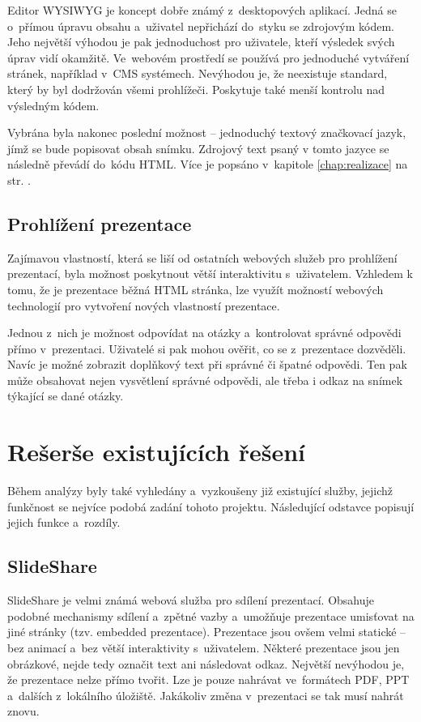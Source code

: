 \documentclass[11pt,twoside,a4paper]{book}
\begin{document}
Editor WYSIWYG je koncept dobře známý z~desktopových aplikací. Jedná se o~přímou úpravu obsahu a~uživatel nepřichází do~styku se zdrojovým kódem. Jeho největší výhodou je pak jednoduchost pro uživatele, kteří výsledek svých úprav vidí okamžitě. Ve~webovém prostředí se používá pro jednoduché vytváření stránek, například v~CMS systémech. Nevýhodou je, že neexistuje standard, který by byl dodržován všemi prohlížeči. Poskytuje také menší kontrolu nad výsledným kódem. 

Vybrána byla nakonec poslední možnost – jednoduchý textový značkovací jazyk, jímž se bude popisovat obsah snímku. Zdrojový text psaný v tomto jazyce se následně převádí do~kódu HTML. Více je popsáno v~kapitole \ref{chap:realizace}  na str. \pageref{chap:realizace}.

\subsection{Prohlížení prezentace}
Zajímavou vlastností, která se liší od ostatních webových služeb pro prohlížení prezentací, byla možnost poskytnout větší interaktivitu s~uživatelem. Vzhledem k tomu, že je prezentace běžná HTML stránka, lze využít možností webových technologií pro vytvoření nových vlastností prezentace.

Jednou z~nich je možnost odpovídat na otázky a~kontrolovat správné odpovědi přímo v~prezentaci. Uživatelé si pak mohou ověřit, co se z~prezentace dozvěděli. Navíc je možné zobrazit doplňkový text při správné či špatné odpovědi. Ten pak může obsahovat nejen vysvětlení správné odpovědi, ale třeba i odkaz na snímek týkající se dané otázky.


\section{Rešerše existujících řešení} \label{chap:existujiciSystemy}
Během analýzy byly také vyhledány a~vyzkoušeny již existující služby, jejichž funkčnost se nejvíce podobá zadání tohoto projektu. Následující odstavce popisují jejich funkce a~rozdíly.


\subsection{SlideShare}
SlideShare \cite{slideshare} je velmi známá webová služba pro sdílení prezentací. Obsahuje podobné mechanismy sdílení a~zpětné vazby a~umožňuje prezentace umisťovat na jiné stránky (tzv. embedded prezentace). Prezentace jsou ovšem velmi statické – bez animací a~bez větší interaktivity s~uživatelem. Některé prezentace jsou jen obrázkové, nejde tedy označit text ani následovat odkaz. Největší nevýhodou je, že prezentace nelze přímo tvořit. Lze je pouze nahrávat ve~formátech PDF, PPT a~dalších z~lokálního úložiště. Jakákoliv změna v~prezentaci se tak musí nahrát znovu.
\end{document}
